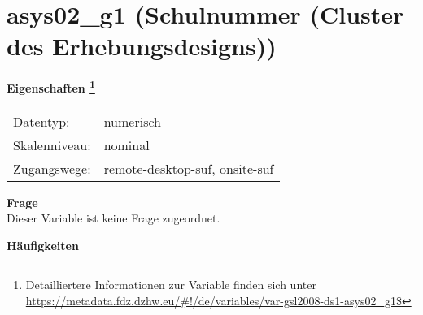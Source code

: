 
    \setcounter{footnote}{0}

    \vspace*{-1.8cm}
	\section{asys02\_g1 (Schulnummer (Cluster des Erhebungsdesigns))}
	\label{section:asys02_g1}



    \vspace*{0.5cm}
    \noindent\textbf{Eigenschaften
	\footnote{Detailliertere Informationen zur Variable finden sich unter
		\url{https://metadata.fdz.dzhw.eu/\#!/de/variables/var-gsl2008-ds1-asys02_g1$}}}\\
	\begin{tabularx}{\hsize}{@{}lX}
	Datentyp: & numerisch \\
	Skalenniveau: & nominal \\
	Zugangswege: &
	  remote-desktop-suf, 
	  onsite-suf
 \\
    \end{tabularx}



		\vspace*{0.5cm}
		\noindent\textbf{Frage}\\
		Dieser Variable ist keine Frage zugeordnet.





        		\vspace*{0.5cm}
                \noindent\textbf{Häufigkeiten}

